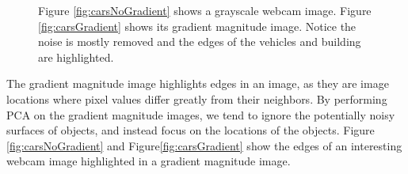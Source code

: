 \begin{figure}[h]
	\centering
		\caption[Highlighting object edges with gradient magnitude images.]{Figure \ref{fig:carsNoGradient} shows a grayscale webcam image. Figure \ref{fig:carsGradient} shows its gradient magnitude image.  Notice the noise is mostly removed and the edges of the vehicles and building are highlighted.}
\end{figure}

The gradient magnitude image highlights edges in an image, as they are image locations where pixel values differ greatly from their neighbors.  By performing PCA on the gradient magnitude images, we tend to ignore the potentially noisy surfaces of objects, and instead focus on the locations of the objects.  Figure \ref{fig:carsNoGradient} and Figure\ref{fig:carsGradient} show the edges of an interesting webcam image highlighted in a gradient magnitude image.


